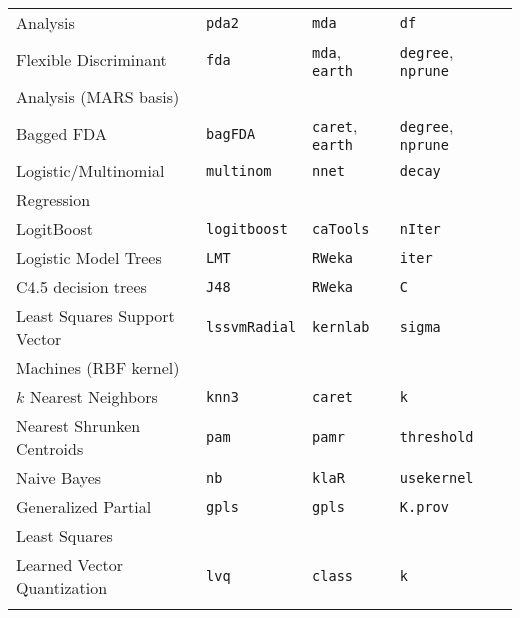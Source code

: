 \documentclass[12pt]{article}
\begin{document}
\begin{longtable}{lllll}
     \: \: Analysis &
         \texttt{pda2} & 
            \texttt{mda}       & 
            \texttt{df} & \\     
      
      Flexible Discriminant  &
         \texttt{fda} & 
            \texttt{mda}, \texttt{earth}       & 
            \texttt{degree}, \texttt{nprune} & \\
      \: \: Analysis (MARS basis)\\      
      
      Bagged FDA &
         \texttt{bagFDA} & 
            \texttt{caret},  \texttt{earth}       & 
            \texttt{degree}, \texttt{nprune} \\   
            
      Logistic/Multinomial  &
         \texttt{multinom} & 
            \texttt{nnet}       & 
            \texttt{decay}& \\   
      \: \: Regression \\ 
      
      LogitBoost &      
         \texttt{logitboost} & 
            \texttt{caTools}       &          
            \texttt{nIter}\\              
            
      Logistic Model Trees &
         \texttt{LMT} & 
            \texttt{RWeka}    & 
            \texttt{iter}  \\  
            
      C4.5 decision trees &
         \texttt{J48} & 
            \texttt{RWeka}    & 
            \texttt{C}  \\  
            
      Least Squares Support Vector  &
         \texttt{lssvmRadial} & 
            \texttt{kernlab}       & 
            \texttt{sigma} \\            
      \:\:  Machines (RBF kernel) & & &\\   
      
                
      $k$ Nearest Neighbors &
         \texttt{knn3} & 
            \texttt{caret}       & 
            \texttt{k} \\   
                  
      Nearest Shrunken Centroids &
         \texttt{pam} & 
            \texttt{pamr}       & 
            \texttt{threshold} \\  
                                                                   
      Naive Bayes &
         \texttt{nb} & 
            \texttt{klaR}       & 
            \texttt{usekernel} \\
        
      Generalized Partial &
         \texttt{gpls} & 
            \texttt{gpls}       & 
            \texttt{K.prov} \\
      \:\: Least Squares \\
      
      Learned Vector Quantization &
         \texttt{lvq} & 
            \texttt{class}       &          
            \texttt{k} \\            
\label{label-name}
\end{longtable}
\end{document}
